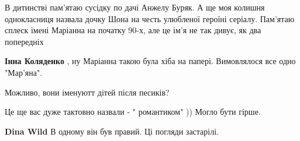 \begin{itemize}
 

В дитинстві пам'ятаю сусідку по дачі Анжелу Буряк. А ще моя колишня
однокласниця назвала дочку Шона на честь улюбленої героїні серіалу. Пам'ятаю
сплеск імені Маріанна на початку 90-х, але це ім'я не так дивує, як два
попередніх \Smiley[1.0][yellow]

\begin{itemize}
 
\textbf{Інна Коляденко} , ну Маріанна такою була хіба на папері. Вимовлялося все одно "Мар'яна".
\end{itemize}

 
Можливо, вони іменуютт дітей після песиків?

 
Це ще вас дуже тактовно назвали - " романтиком" )) Могло бути гірше.

\begin{itemize}
 
\textbf{Dina Wild} В одному він був правий. Ці погляди застарілі.

 

\end{itemize}
\end{itemize}
